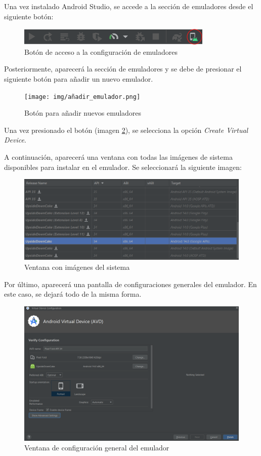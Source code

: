 Una vez instalado Android Studio, se accede a la sección de emuladores desde el siguiente botón:
\begin{figure}[H]
    \centering
    \includegraphics[width=0.7\linewidth]{img/boton_emulador.png}
    \caption{Botón de acceso a la configuración de emuladores}
    \label{fig:boton_emulador}
\end{figure}

Posteriormente, aparecerá la sección de emuladores y se debe de presionar el siguiente botón para añadir un nuevo emulador.
\begin{figure}[H]
    \centering
    \texttt{[image: img/añadir\_emulador.png]}
    \caption{Botón para añadir nuevos emuladores}
    \label{fig:añadir_emulador}
\end{figure}

Una vez presionado el botón (imagen \ref{fig:añadir_emulador}), se selecciona la opción \textit{Create Virtual Device}.

A continuación, aparecerá una ventana con todas las imágenes de sistema disponibles para instalar en el emulador. Se seleccionará la siguiente imagen:
\begin{figure}[H]
    \centering
    \includegraphics[width=0.7\linewidth]{img/system_image.png}
    \caption{Ventana con imágenes del sistema}
    \label{fig:system_images}
\end{figure}

Por último, aparecerá una pantalla de configuraciones generales del emulador. En este caso, se dejará todo de la misma forma.
\begin{figure}[H]
    \centering
    \includegraphics[width=0.9\linewidth]{img/pantalla_final_emulador.png}
    \caption{Ventana de configuración general del emulador}
    \label{fig:pantalla_final_emulador}
\end{figure}

